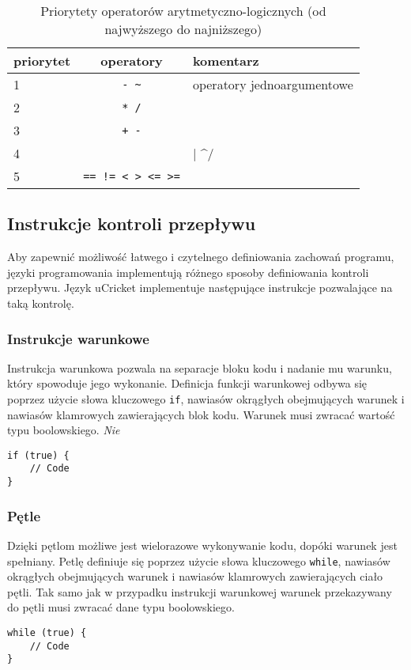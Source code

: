 \begin{table}
\centering
\caption{Priorytety operatorów arytmetyczno-logicznych (od najwyższego do najniższego)}
\begin{tabular}{lcl}
\toprule
priorytet & operatory & komentarz \\ \midrule
1 & \lstinline|- ~| & operatory jednoargumentowe \\
2 & \lstinline|* /| & \\
3 & \lstinline|+ -| & \\
4 & \lstinline/& | ^/ & \\
5 & \lstinline|== != < > <= >=| & \\ \bottomrule
\end{tabular}
\label{tbl:priorytety-operatorow}
\end{table}

\subsection{Instrukcje kontroli przepływu}
Aby zapewnić możliwość łatwego i czytelnego definiowania zachowań programu, języki programowania implementują różnego sposoby definiowania kontroli przepływu. Język uCricket implementuje następujące instrukcje pozwalające na taką kontrolę.

\subsubsection{Instrukcje warunkowe}
Instrukcja warunkowa pozwala na separacje bloku kodu i nadanie mu warunku, który spowoduje jego wykonanie. Definicja funkcji warunkowej odbywa się poprzez użycie słowa kluczowego \lstinline|if|, nawiasów okrągłych obejmujących warunek i nawiasów klamrowych zawierających blok kodu. Warunek musi zwracać wartość typu boolowskiego.  \textit{Nie}
\begin{lstlisting}
if (true) {
	// Code
}
\end{lstlisting}

\subsubsection{Pętle}
Dzięki pętlom możliwe jest wielorazowe wykonywanie kodu, dopóki warunek jest spełniany. Petlę definiuje się poprzez użycie słowa kluczowego \lstinline|while|, nawiasów okrągłych obejmujących warunek i nawiasów klamrowych zawierających ciało pętli. Tak samo jak w przypadku instrukcji warunkowej  warunek przekazywany do pętli musi zwracać dane typu boolowskiego.
\begin{lstlisting}
while (true) {
	// Code
}
\end{lstlisting}
 
